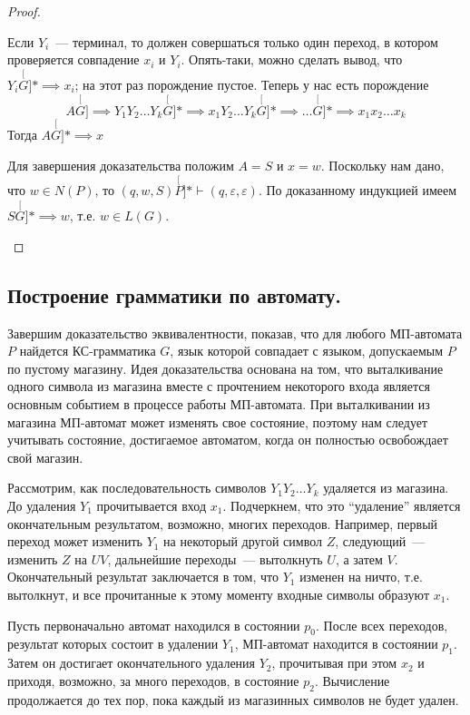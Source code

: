 \documentclass[a4paper,12pt]{article}
\begin{document}
\begin{proof}
\begin{description}
\begin{description}
			Если \(Y_i\)~--- терминал, то должен совершаться только один переход, в котором проверяется совпадение \(x_i\) и \(Y_i\). Опять-таки, можно сделать вывод, что \(Y_i \stackrel[G]{*}{\implies} x_i\); на этот раз порождение пустое. Теперь у нас есть порождение
			\[A \stackrel[G]{}{\implies} Y_1 Y_2 \ldots Y_k \stackrel[G]{*}{\implies} x_1 Y_2 \ldots Y_k \stackrel[G]{*}{\implies} \ldots \stackrel[G]{*}{\implies} x_1 x_2 \ldots x_k\]
			Тогда \(A \stackrel[G]{*}{\implies} x\)
		\end{description}
		Для завершения доказательства положим \(A = S\) и \(x = w\). Поскольку нам дано, что \(w \in N(P)\), то \((q, w, S) \stackrel[P]{*}{\vdash} (q, \varepsilon, \varepsilon)\). По доказанному индукцией имеем \(S \stackrel[G]{*}{\implies} w\), т.е. \(w \in L(G)\).  
	\end{description}
\end{proof}

\subsection{Построение грамматики по автомату.}
Завершим доказательство эквивалентности, показав, что для любого МП-автомата \(P\) найдется КС-грамматика \(G\), язык которой совпадает с языком, допускаемым \(P\) по пустому магазину. Идея доказательства основана на том, что выталкивание одного символа из магазина вместе с прочтением некоторого входа является основным событием в процессе работы МП-автомата. При выталкивании из магазина МП-автомат может изменять свое состояние, поэтому нам следует учитывать состояние, достигаемое автоматом, когда он полностью освобождает свой магазин.

Рассмотрим, как последовательность символов \(Y_1 Y_2 \ldots Y_k\) удаляется из магазина. До удаления \(Y_1\) прочитывается вход \(x_1\). Подчеркнем, что это ``удаление'' является окончательным результатом, возможно, многих переходов. Например, первый переход может изменить \(Y_1\) на некоторый другой символ \(Z\), следующий~--- изменить \(Z\) на \(UV\), дальнейшие переходы~--- вытолкнуть \(U\), а затем \(V\). Окончательный результат заключается в том, что \(Y_1\) изменен на ничто, т.е. вытолкнут, и все прочитанные к этому моменту входные символы образуют \(x_1\).

Пусть первоначально автомат находился в состоянии \(p_0\). После всех переходов, результат которых состоит в удалении \(Y_1\), МП-автомат находится в состоянии \(p_1\). Затем он достигает окончательного удаления \(Y_2\), прочитывая при этом \(x_2\) и приходя, возможно, за много переходов, в состояние \(p_2\). Вычисление продолжается до тех пор, пока каждый из магазинных символов не будет удален.
\end{document}
